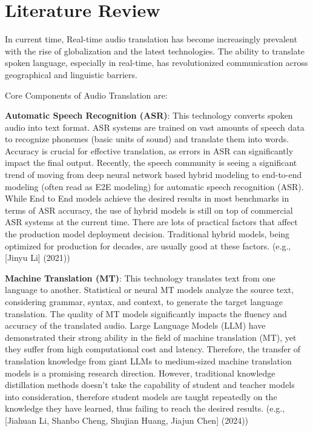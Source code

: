 \documentclass[12px, a4paper]{article}
\begin{document}
\section{Literature Review}
In current time, Real-time audio translation has become increasingly prevalent with the rise of globalization and the latest technologies. The ability to translate spoken language, especially in real-time, has revolutionized communication across geographical and linguistic barriers. 

Core Components of Audio Translation are:

\textbf{Automatic Speech Recognition (ASR)}: This technology converts spoken audio into text format. ASR systems are trained on vast amounts of speech data to recognize phonemes (basic units of sound) and translate them into words. Accuracy is crucial for effective translation, as errors in ASR can significantly impact the final output. Recently, the speech community is seeing a significant trend of moving from deep neural network based hybrid modeling to end-to-end modeling (often read as E2E modeling) for automatic speech recognition (ASR). While End to End models achieve the desired results in most benchmarks in terms of ASR accuracy, the use of hybrid models is still on top of commercial ASR systems at the current time. There are lots of practical factors that affect the production model deployment decision. Traditional hybrid models, being optimized for production for decades, are usually good at these factors. (e.g., [Jinyu Li] (2021))

\textbf{Machine Translation (MT)}: This technology translates text from one language to another. Statistical or neural MT models analyze the source text, considering grammar, syntax, and context, to generate the target language translation. The quality of MT models significantly impacts the fluency and accuracy of the translated audio. Large Language Models (LLM) have demonstrated their strong ability in the field of machine translation (MT), yet they suffer from high computational cost and latency. Therefore, the transfer of translation knowledge from giant LLMs to medium-sized machine translation models is a promising research direction. However, traditional knowledge distillation methods doesn't take the capability of student and teacher models into consideration, therefore student models are taught repeatedly on the knowledge they have learned, thus failing to reach the desired results. (e.g., [Jiahuan Li, Shanbo Cheng, Shujian Huang, Jiajun Chen] (2024))
\end{document}

